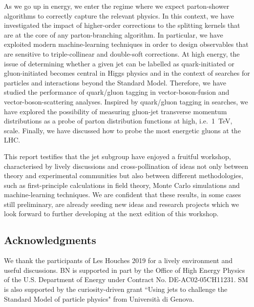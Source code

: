 \documentclass[11pt]{cernrep}
\begin{document}
As we go up in energy, we enter the regime where we expect parton-shower algorithms to correctly capture the relevant physics. In this context, we have investigated the impact of higher-order corrections to the splitting kernels that are at the core of any parton-branching algorithm. In particular, we have exploited modern machine-learning techniques in order to design observables that are sensitive to triple-collinear and double-soft corrections. 
%
At high energy, the issue of determining whether a given jet can be labelled as quark-initiated or gluon-initiated becomes central in Higgs physics and in the context of searches for particles and interactions beyond the Standard Model. Therefore, we have studied the performance of quark/gluon tagging in vector-boson-fusion and vector-boson-scattering analyses. Inspired by quark/gluon tagging in searches, we have explored the possibility of measuring gluon-jet transverse momentum distributions as a probe of parton distribution functions at high, i.e.\ 1~TeV, scale.
%
Finally, we have discussed how to probe the most energetic gluons at the LHC.


This report testifies that the jet subgroup have enjoyed a fruitful workshop, characterised by lively discussions and cross-pollination of ideas not only between theory and experimental communities but also between different methodologies, such as first-principle calculations in field theory, Monte Carlo simulations and machine-learning techniques. 
%
We are confident that these results, in some cases still preliminary, are already seeding new ideas and research projects which we look forward to further developing at the next edition of this workshop. 	



\subsection*{Acknowledgments}

We thank the participants of Les Houches 2019 for a lively environment and useful discussions.
BN is supported in part by the Office of High Energy Physics of the U.S. Department of Energy under Contract No. DE-AC02-05CH11231.
%
SM is also supported by the curiosity-driven grant ``Using jets to challenge the Standard Model of particle physics" from Universit\`a di Genova.


\end{document}
